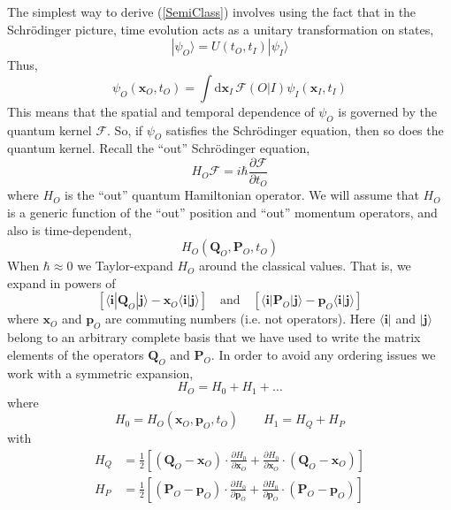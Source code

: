 The simplest way to derive (\ref{SemiClass}) involves using the fact that in the Schr\"{o}dinger picture, time evolution acts as a unitary transformation on states,
\begin{equation}
	| \psi_{O} \rangle = U(t_{O}, t_{I}) | \psi_{I} \rangle
\end{equation}
Thus,
\begin{equation}
	\psi_{O}(\mathbf{x}_{O}, t_{O}) = \int \mathrm{d} \mathbf{x}_{I} \, \mathcal{F}(O|I) \psi_{I}(\mathbf{x}_{I}, t_{I})
\end{equation}
This means that the spatial and temporal dependence of $\psi_{O}$ is governed by the quantum kernel $\mathcal{F}$. So, if $\psi_{O}$ satisfies the Schr\"{o}dinger equation, then so does the quantum kernel. Recall the ``out'' Schr\"{o}dinger equation,
\begin{equation}
	H_{O} \mathcal{F} = i \hbar \frac{\partial \mathcal{F}}{\partial t_{O}}
\end{equation}
where $H_{O}$ is the ``out'' quantum Hamiltonian operator. We will assume that $H_{O}$ is a generic function of the ``out'' position and ``out'' momentum operators, and also is time-dependent,
\begin{equation}
	H_{O}(\mathbf{Q}_{O}, \mathbf{P}_{O}, t_{O})
\end{equation}
When $\hbar \approx 0$ we Taylor-expand $H_{O}$ around the classical values. That is, we expand in powers of
\begin{equation}
	\left[ \langle \mathbf{i}| \mathbf{Q}_{O} | \mathbf{j} \rangle - \mathbf{x}_{O} \langle \mathbf{i}| \mathbf{j} \rangle  \right] \quad \text{and} \quad \left[ \langle \mathbf{i}| \mathbf{P}_{O} | \mathbf{j} \rangle - \mathbf{p}_{O} \langle \mathbf{i}| \mathbf{j} \rangle  \right]
\end{equation}
where $\mathbf{x}_{O}$ and $\mathbf{p}_{O}$ are commuting numbers (i.e. not operators). Here $\langle \mathbf{i} |$ and $| \mathbf{j} \rangle$ belong to an arbitrary complete basis that we have used to write the matrix elements of the operators $\mathbf{Q}_{O}$ and $\mathbf{P}_{O}$. In order to avoid any ordering issues we work with a symmetric expansion,
\begin{equation}
	H_{O} = H_{0} + H_{1} + \ldots
\end{equation}
where
\begin{equation}
	H_{0} = H_{O}(\mathbf{x}_{O}, \mathbf{p}_{O}, t_{O}) \qquad H_{1} = H_{Q} + H_{P}
\end{equation}
with
\begin{align}
	H_{Q} &= \frac{1}{2} \left[ (\mathbf{Q}_{O} - \mathbf{x}_{O}) \cdot \frac{\partial H_{0}}{\partial \mathbf{x}_{O}} + \frac{\partial H_{0}}{\partial \mathbf{x}_{O}} \cdot (\mathbf{Q}_{O} - \mathbf{x}_{O}) \right] \\
	H_{P} &= \frac{1}{2} \left[ (\mathbf{P}_{O} - \mathbf{p}_{O}) \cdot \frac{\partial H_{0}}{\partial \mathbf{p}_{O}} + \frac{\partial H_{0}}{\partial \mathbf{p}_{O}} \cdot (\mathbf{P}_{O} - \mathbf{p}_{O}) \right]
\end{align}
